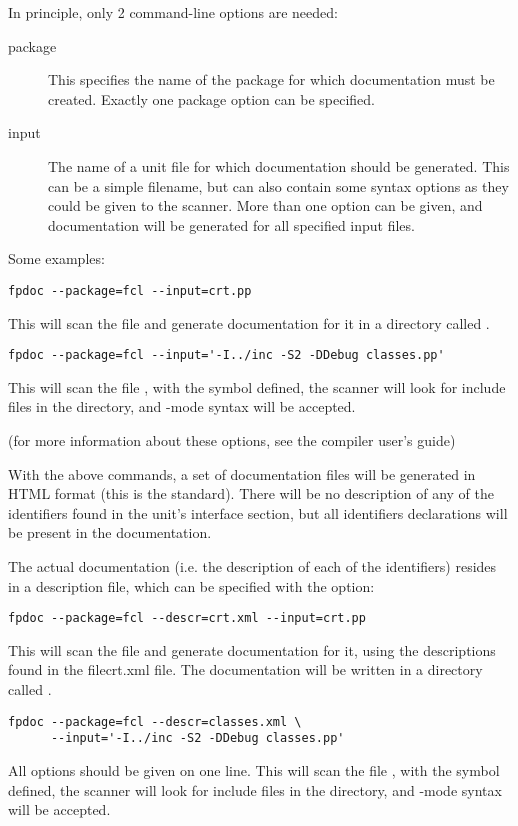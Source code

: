 In principle, only 2 command-line options are needed:
\begin{description}
\item[package] This specifies the name of the package for which
documentation must be created. Exactly one package option can be 
specified.
\item[input] The name of a unit file for which documentation should be
generated. This can be a simple filename, but can also contain some syntax
options as they could be given to the \fpc scanner. More than one
 option can be given, and documentation will be generated for all
specified input files.
\end{description}

Some examples:
\begin{verbatim}
fpdoc --package=fcl --input=crt.pp
\end{verbatim}
This will scan the  file and generate documentation for it
in a directory called .
\begin{verbatim}
fpdoc --package=fcl --input='-I../inc -S2 -DDebug classes.pp'
\end{verbatim}
This will scan the file , with the  symbol
defined, the scanner will look for include files in the 
directory, and -mode syntax will be accepted.

(for more information about these options, see the \fpc compiler user's
guide)

With the above commands, a set of documentation files will be generated in
HTML format (this is the standard). There will be no description of any of
the identifiers found in the unit's interface section, but all identifiers
declarations will be present in the documentation. 

The actual documentation (i.e. the description of each of the identifiers) 
resides in a description file, which can be specified with the  
option:

\begin{verbatim}
fpdoc --package=fcl --descr=crt.xml --input=crt.pp
\end{verbatim}
This will scan the  file and generate documentation for it,
using the descriptions found in the file{crt.xml} file. The documentation
will be written in a directory called .
\begin{verbatim}
fpdoc --package=fcl --descr=classes.xml \
      --input='-I../inc -S2 -DDebug classes.pp'
\end{verbatim}
All options should be given on one line.
This will scan the file , with the  symbol
defined, the scanner will look for include files in the \file{../inc}
directory, and \var{OBJFPC}-mode syntax will be accepted.


